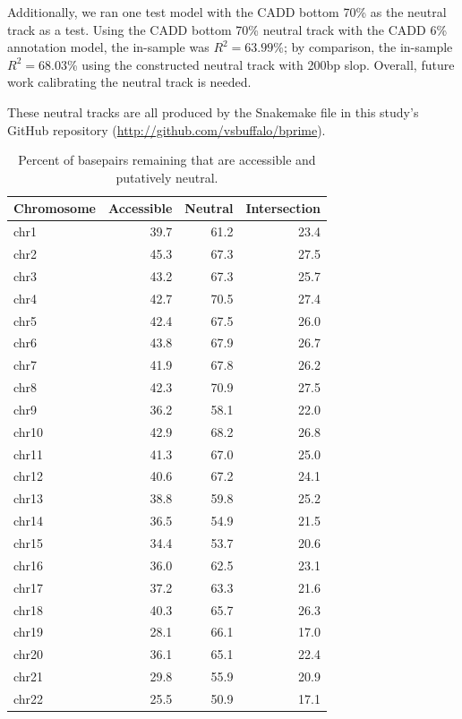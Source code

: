 \documentclass[11pt]{article}
\begin{document}
Additionally, we ran one test model with the CADD bottom 70\% as the neutral
track as a test. Using the CADD bottom 70\% neutral track with the CADD 6\%
annotation model, the in-sample was $R^2=63.99$\%; by comparison, the in-sample
$R^2=68.03$\% using the constructed neutral track with 200bp slop. Overall,
future work calibrating the neutral track is needed.

These neutral tracks are all produced by the Snakemake file
 in this study's GitHub repository
(\url{http://github.com/vsbuffalo/bprime}).

\begin{table}
\centering
\caption{Percent of basepairs remaining that are accessible and 
         putatively neutral.}
\begin{tabular}{|l|rrr|}
\hline
Chromosome & Accessible & Neutral & Intersection \\
\hline
 chr1 &        39.7 &     61.2 &  23.4 \\
 chr2 &        45.3 &     67.3 &  27.5 \\
 chr3 &        43.2 &     67.3 &  25.7 \\
 chr4 &        42.7 &     70.5 &  27.4 \\
 chr5 &        42.4 &     67.5 &  26.0 \\
 chr6 &        43.8 &     67.9 &  26.7 \\
 chr7 &        41.9 &     67.8 &  26.2 \\
 chr8 &        42.3 &     70.9 &  27.5 \\
 chr9 &        36.2 &     58.1 &  22.0 \\
chr10 &        42.9 &     68.2 &  26.8 \\
chr11 &        41.3 &     67.0 &  25.0 \\
chr12 &        40.6 &     67.2 &  24.1 \\
chr13 &        38.8 &     59.8 &  25.2 \\
chr14 &        36.5 &     54.9 &  21.5 \\
chr15 &        34.4 &     53.7 &  20.6 \\
chr16 &        36.0 &     62.5 &  23.1 \\
chr17 &        37.2 &     63.3 &  21.6 \\
chr18 &        40.3 &     65.7 &  26.3 \\
chr19 &        28.1 &     66.1 &  17.0 \\
chr20 &        36.1 &     65.1 &  22.4 \\
chr21 &        29.8 &     55.9 &  20.9 \\
chr22 &        25.5 &     50.9 &  17.1 \\
\hline
\end{tabular}
\end{table}
\end{document}
